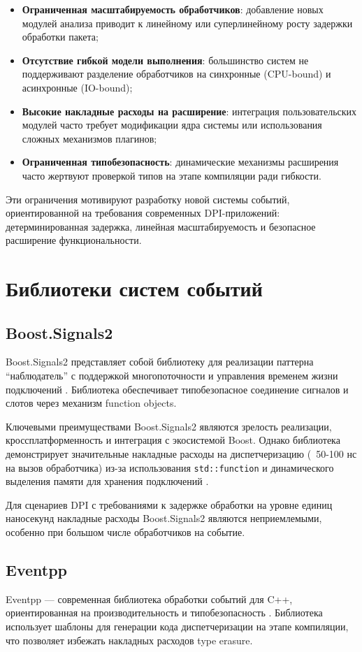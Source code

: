 \documentclass[12pt,a4paper]{report}
\begin{document}
\begin{itemize}
    \item \textbf{Ограниченная масштабируемость обработчиков}: добавление новых модулей анализа приводит к линейному или суперлинейному росту задержки обработки пакета;
    \item \textbf{Отсутствие гибкой модели выполнения}: большинство систем не поддерживают разделение обработчиков на синхронные (CPU-bound) и асинхронные (IO-bound);
    \item \textbf{Высокие накладные расходы на расширение}: интеграция пользовательских модулей часто требует модификации ядра системы или использования сложных механизмов плагинов;
    \item \textbf{Ограниченная типобезопасность}: динамические механизмы расширения часто жертвуют проверкой типов на этапе компиляции ради гибкости.
\end{itemize}

Эти ограничения мотивируют разработку новой системы событий, ориентированной на требования современных DPI-приложений: детерминированная задержка, линейная масштабируемость и безопасное расширение функциональности.

\section{Библиотеки систем событий}
\subsection{Boost.Signals2}
Boost.Signals2 представляет собой библиотеку для реализации паттерна ``наблюдатель'' с поддержкой многопоточности и управления временем жизни подключений \cite{boost2023}. Библиотека обеспечивает типобезопасное соединение сигналов и слотов через механизм function objects.

Ключевыми преимуществами Boost.Signals2 являются зрелость реализации, кроссплатформенность и интеграция с экосистемой Boost. Однако библиотека демонстрирует значительные накладные расходы на диспетчеризацию (~50-100 нс на вызов обработчика) из-за использования \texttt{std::function} и динамического выделения памяти для хранения подключений \cite{schaling2011boost}.

Для сценариев DPI с требованиями к задержке обработки на уровне единиц наносекунд накладные расходы Boost.Signals2 являются неприемлемыми, особенно при большом числе обработчиков на событие.

\subsection{Eventpp}
Eventpp — современная библиотека обработки событий для C++, ориентированная на производительность и типобезопасность \cite{eventpp2023}. Библиотека использует шаблоны для генерации кода диспетчеризации на этапе компиляции, что позволяет избежать накладных расходов type erasure.
\end{document}
